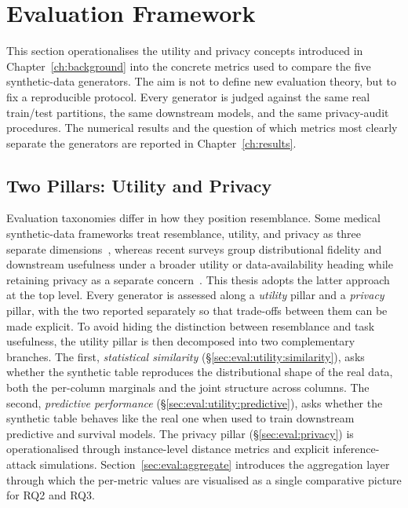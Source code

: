 
\section{Evaluation Framework}
\label{sec:method:evaluation}

This section operationalises the utility and privacy concepts introduced
in Chapter~\ref{ch:background} into the concrete metrics used to compare
the five synthetic-data generators. The aim is not to define new
evaluation theory, but to fix a reproducible protocol. Every generator is
judged against the same real train/test partitions, the same downstream
models, and the same privacy-audit procedures. The numerical results and
the question of which metrics most clearly separate the generators are
reported in Chapter~\ref{ch:results}.


\subsection{Two Pillars: Utility and Privacy}
\label{sec:eval:pillars}

Evaluation taxonomies differ in how they position resemblance. Some
medical synthetic-data frameworks treat resemblance, utility, and
privacy as three separate dimensions~\cite{hernandez2022synthetic}, whereas recent surveys group
distributional fidelity and downstream usefulness under a broader
utility or data-availability heading while retaining privacy as a
separate concern~\cite{kaabachi2025scoping,shi2025comprehensive}. This
thesis adopts the latter approach at the top level. Every generator
is assessed along a \emph{utility} pillar and a \emph{privacy} pillar,
with the two reported separately so that trade-offs between them can be
made explicit. To avoid hiding the distinction between resemblance and
task usefulness, the utility pillar is then decomposed into two
complementary branches. The first, \emph{statistical similarity}
(\S\ref{sec:eval:utility:similarity}), asks whether the synthetic table
reproduces the distributional shape of the real data, both the
per-column marginals and the joint structure across columns. The
second, \emph{predictive performance}
(\S\ref{sec:eval:utility:predictive}), asks whether the synthetic table
behaves like the real one when used to train downstream predictive and
survival models. The privacy pillar (\S\ref{sec:eval:privacy}) is
operationalised through instance-level distance metrics and explicit
inference-attack simulations. Section~\ref{sec:eval:aggregate}
introduces the aggregation layer through which the per-metric values
are visualised as a single comparative picture for RQ2 and RQ3.

